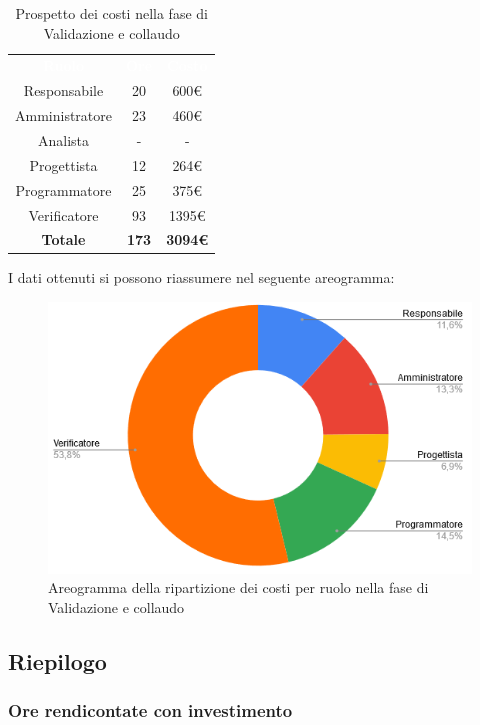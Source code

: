 \begin{table}[H]
\centering\renewcommand{\arraystretch}{1.5}
\caption{Prospetto dei costi nella fase di Validazione e collaudo}
\vspace{0.2cm}
\begin{tabular}{ c | c | c  }
\rowcolor{redafk}
\textcolor{white}{\textbf{Ruolo}} & \textcolor{white}{\textbf{Ore}} & 
\textcolor{white}{\textbf{Costo}}  \\
Responsabile & 20 & 600€ \\
Amministratore & 23 & 460€ \\
Analista & - & - \\
Progettista	& 12 & 264€ \\
Programmatore & 25 & 375€  \\
Verificatore & 93 & 1395€  \\
\rowcolor{lastrowcolor}
\textbf{Totale} & \textbf{173} & \textbf{3094€}  \\
\end{tabular}
\end{table}

I dati ottenuti si possono riassumere nel seguente areogramma:
\begin{figure}[H]
\centering
\includegraphics[scale=0.60]{img/grafici/torta_fase_val_col.png}
\caption{Areogramma della ripartizione dei costi per ruolo nella fase di Validazione e collaudo}
\end{figure}


\subsection{Riepilogo}
\subsubsection{Ore rendicontate con investimento}
